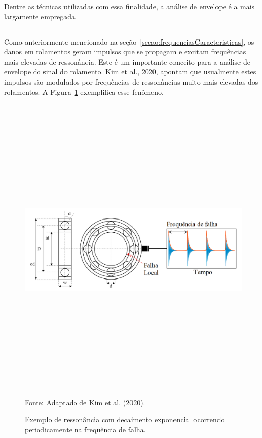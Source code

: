 \documentclass[
	12pt,				
	oneside,			
	a4paper,			
	english,			
	brazil,			
	]{abntex2ppgsi}
\begin{document}
Dentre as técnicas utilizadas com essa finalidade, a análise de envelope é a mais largamente empregada. 

\subsection{}

Como anteriormente mencionado na seção~\ref{secao:frequenciasCaracteristicas}, os danos em rolamentos geram impulsos que se propagam e excitam frequências mais elevadas de ressonância. Este é um importante conceito para a análise de envelope do sinal do rolamento. Kim et al., 2020, apontam que usualmente estes impulsos são modulados por frequências de ressonâncias muito mais elevadas dos rolamentos. A Figura~\ref{exemplo_ressonancia_falha} exemplifica esse fenômeno.

\begin{figure}[!htb]
\centering
\caption {Exemplo de ressonância com decaimento exponencial ocorrendo periodicamente na frequência de falha.}
\includegraphics[width=\textwidth,height=150mm,keepaspectratio]{exemplo_ressonancia_falha} \\
Fonte: Adaptado de Kim et al. (2020).
\label{exemplo_ressonancia_falha}
\end{figure}
\end{document}
